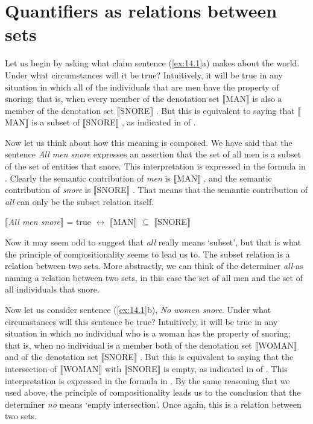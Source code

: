 \section{Quantifiers as relations between sets}\label{sec:14.2}

Let us begin by asking what claim sentence (\ref{ex:14.1}a) makes about the world. Under what circumstances will it be true? Intuitively, it will be true in any situation in which all of the individuals that are men have the property of snoring; that is, when every member of the denotation set $\llbracket$MAN$\rrbracket$  is also a member of the denotation set $\llbracket$SNORE$\rrbracket$ . But this is equivalent to saying that $\llbracket$MAN$\rrbracket$  is a subset of $\llbracket$SNORE$\rrbracket$ , as indicated in  of .



Now let us think about how this meaning is composed. We have said that the sentence \textit{All men snore} expresses an assertion that the set of all men is a subset of the set of entities that snore. This interpretation is expressed in the formula in . Clearly the semantic contribution of \textit{men} is $\llbracket$MAN$\rrbracket$ , and the semantic contribution of \textit{snore} is $\llbracket$SNORE$\rrbracket$ . That means that the semantic contribution of \textit{all} can only be the subset relation itself.


\ea \label{ex:14.2}
{}$\llbracket$\textit{All men snore}$\rrbracket$  = true $\leftrightarrow $ $\llbracket$MAN$\rrbracket$  ${\subseteq}$ $\llbracket$SNORE$\rrbracket$ 
\z


Now it may seem odd to suggest that \textit{all} really means ‘subset’, but that is what the principle of compositionality seems to lead us to. The subset relation is a relation between two sets. More abstractly, we can think of the determiner \textit{all} as naming a relation between two sets, in this case the set of all men and the set of all individuals that snore.



Now let us consider sentence (\ref{ex:14.1}b), \textit{No women snore}. Under what circumstances will this sentence be true? Intuitively, it will be true in any situation in which no individual who is a woman has the property of snoring; that is, when no individual is a member both of the denotation set $\llbracket$WOMAN$\rrbracket$  and of the denotation set $\llbracket$SNORE$\rrbracket$ . But this is equivalent to saying that the intersection of $\llbracket$WOMAN$\rrbracket$  with $\llbracket$SNORE$\rrbracket$  is empty, as indicated in  of . This interpretation is expressed in the formula in . By the same reasoning that we used above, the principle of compositionality leads us to the conclusion that the determiner \textit{no} means ‘empty intersection’. Once again, this is a relation between two sets.


